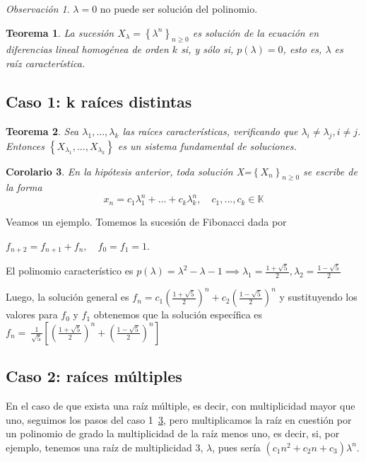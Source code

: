 \documentclass[a4paper, 12pt]{article}
\theoremstyle{plain}
\newtheorem{teorema}{Teorema}[section]
\newtheorem{coro}[teorema]{Corolario}
\theoremstyle{definition}
\theoremstyle{remark}
\newtheorem*{observacion}{Observación}
\begin{document}
	\begin{observacion}
		$\lambda=0$ no puede ser solución del polinomio.
	\end{observacion}

	\begin{teorema}\label{sol2}
		La sucesión $X_{\lambda}=\left\{\lambda^n\right\}_{n\geq 0}$ es solución de la ecuación en diferencias lineal homogénea de orden $k$ si, y sólo si, $p(\lambda) = 0$, esto es, $\lambda$ es raíz característica.
	\end{teorema}

	\subsection{Caso 1: k raíces distintas}
	\begin{teorema}\label{k raices}
		Sea $\lambda_1,...,\lambda_k$ las raíces características, verificando que $\lambda_i \neq \lambda_j, i\neq j$. Entonces $\left\{X_{\lambda_1},...,X_{\lambda_k}\right\}$ es un sistema fundamental de soluciones.
	\end{teorema}

	\begin{coro}\label{Kcoro}
		En la hipótesis anterior, toda solución X=$\left\{X_n\right\}_{n\geq 0}$ se escribe de la forma
		\[x_n=c_1\lambda_1^n+...+c_k\lambda_k^n, \quad c_1,...,c_k \in \mathbb{K}\]
	\end{coro}

	\textcolor{Azul}{Veamos un ejemplo. Tomemos la sucesión de Fibonacci dada por}
	
	\textcolor{Azul}{$f_{n+2}=f_{n+1}+f_n, \quad f_0=f_1=1$.}
	
	\textcolor{Azul}{El polinomio característico es $p(\lambda) = \lambda^2-\lambda-1 \implies \lambda_1 = \frac{1+\sqrt{5}}{2} ,\lambda_2=\frac{1-\sqrt{5}}{2}$}
	
	\textcolor{Azul}{Luego, la solución general es $f_n=c_1\left(\frac{1+\sqrt{5}}{2}\right)^n+c_2\left(\frac{1-\sqrt{5}}{2}\right)^n$ y sustituyendo los valores para $f_0$ y $f_1$ obtenemos que la solución específica es $f_n=~\frac{1}{\sqrt{5}}\left[\left(\frac{1+\sqrt{5}}{2}\right)^n+\left(\frac{1-\sqrt{5}}{2}\right)^n\right]$}
	
	\subsection{Caso 2: raíces múltiples}
	En el caso de que exista una raíz múltiple, es decir, con multiplicidad mayor que uno, seguimos los pasos del caso 1~\ref{Kcoro}, pero multiplicamos la raíz en cuestión por un polinomio de grado la multiplicidad de la raíz menos uno, es decir, si, por ejemplo, tenemos una raíz de multiplicidad 3, $\lambda$, pues sería $\left(c_1n^2+c_2n+c_3\right)\lambda^n$.
	
\end{document}
